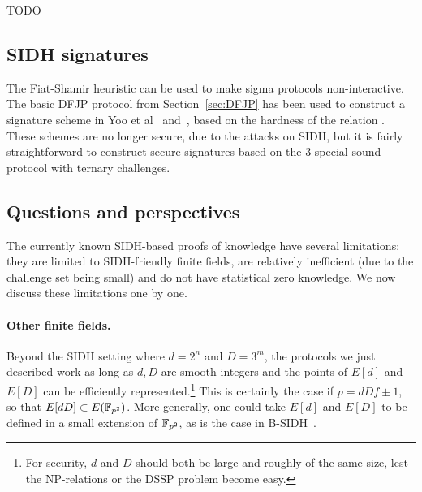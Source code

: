 TODO


\subsection{SIDH signatures}

The Fiat-Shamir heuristic can be used to make sigma protocols non-interactive.
The basic DFJP protocol from Section~\ref{sec:DFJP} has been used to construct a signature scheme in Yoo et al~\cite{YAJJS17} and~\cite{GPS20}, based on the hardness of the relation \R[isog].
These schemes are no longer secure, due to the attacks on SIDH, but it is fairly straightforward to construct secure signatures based on the 3-special-sound protocol with ternary challenges.




%
%


\subsection{Questions and perspectives}

The currently known SIDH-based proofs of knowledge have several limitations: they are limited to SIDH-friendly finite fields, are relatively inefficient (due to the challenge set being small) and do not have statistical zero knowledge.
We now discuss these limitations one by one.

\paragraph{Other finite fields.}
Beyond the SIDH setting where $d=2^n$ and $D=3^m$, the protocols we just described work as long as $d,D$ are smooth integers and the points of $E[d]$ and $E[D]$ can be efficiently represented.\footnote{For security, $d$ and $D$ should both be large and roughly of the same size, lest the NP-relations or the DSSP problem become easy.}
This is certainly the case if $p = dDf \pm 1$, so that $E[dD] \subset E(\mathbb{F}_{p^2})$.
More generally, one could take $E[d]$ and $E[D]$ to be defined in a small extension of $\mathbb{F}_{p^2}$, as is the case in B-SIDH~\cite{10.1007/978-3-030-64834-3_15}.

